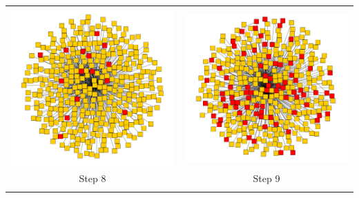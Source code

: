 \documentclass[12pt, oneside, openany]{article} %
\newcommand\Bstrut{\rule[-0.9ex]{0pt}{0pt}} %
\begin{document}
\begin{table}[p]
\begin{tabular}{| c | c |}
&\\
  	\includegraphics[scale=0.11]{comp8.png} & \includegraphics[scale=0.11]{comp9.png} \\
	Step 8 & Step 9 \Bstrut \\
  	\hline
&\\

\end{tabular}
\end{table}
\end{document}
